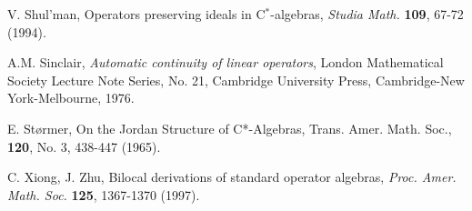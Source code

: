 \documentclass[11pt]{amsart}
\begin{document}
\begin{thebibliography}{22}
 V. Shul'man, Operators preserving ideals in C$^*$-algebras, \emph{Studia Math.} \textbf{109}, 67-72 (1994).

 A.M. Sinclair, \emph{Automatic continuity of linear operators},
London Mathematical Society Lecture Note Series, No. 21,
Cambridge University Press, Cambridge-New York-Melbourne, 1976.

 E. St{\o}rmer, On the Jordan Structure of C*-Algebras, Trans. Amer. Math. Soc., \textbf{120}, No. 3, 438-447 (1965).

 C. Xiong, J. Zhu, Bilocal derivations of standard operator algebras, \emph{Proc. Amer. Math. Soc.} \textbf{125}, 1367-1370 (1997).

\end{thebibliography}
\end{document}
